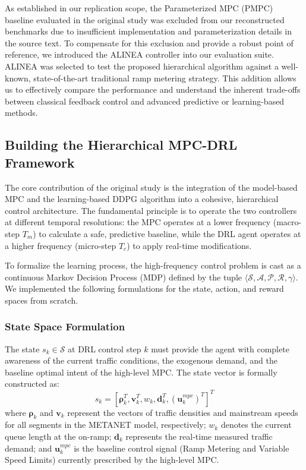 As established in our replication scope, the Parameterized MPC (PMPC) baseline evaluated in the original study was excluded from our reconstructed benchmarks due to insufficient implementation and parameterization details in the source text. To compensate for this exclusion and provide a robust point of reference, we introduced the ALINEA controller into our evaluation suite. ALINEA was selected to test the proposed hierarchical algorithm against a well-known, state-of-the-art traditional ramp metering strategy. This addition allows us to effectively compare the performance and understand the inherent trade-offs between classical feedback control and advanced predictive or learning-based methods.

\subsection{Building the Hierarchical MPC-DRL Framework}

The core contribution of the original study is the integration of the model-based MPC and the learning-based DDPG algorithm into a cohesive, hierarchical control architecture. The fundamental principle is to operate the two controllers at different temporal resolutions: the MPC operates at a lower frequency (macro-step $T_m$) to calculate a safe, predictive baseline, while the DRL agent operates at a higher frequency (micro-step $T_c$) to apply real-time modifications.

To formalize the learning process, the high-frequency control problem is cast as a continuous Markov Decision Process (MDP) defined by the tuple $\langle \mathcal{S}, \mathcal{A}, \mathcal{P}, \mathcal{R}, \gamma \rangle$. We implemented the following formulations for the state, action, and reward spaces from scratch.

\subsubsection*{State Space Formulation}
The state $s_k \in \mathcal{S}$ at DRL control step $k$ must provide the agent with complete awareness of the current traffic conditions, the exogenous demand, and the baseline optimal intent of the high-level MPC. The state vector is formally constructed as:
\begin{equation}
    s_k = \left[ \bm{\rho}_k^T, \bm{v}_k^T, w_k, \bm{d}_k^T, (\bm{u}_{k}^{mpc})^T \right]^T
\end{equation}
where $\bm{\rho}_k$ and $\bm{v}_k$ represent the vectors of traffic densities and mainstream speeds for all segments in the METANET model, respectively; $w_k$ denotes the current queue length at the on-ramp; $\bm{d}_k$ represents the real-time measured traffic demand; and $\bm{u}_{k}^{mpc}$ is the baseline control signal (Ramp Metering and Variable Speed Limits) currently prescribed by the high-level MPC.

